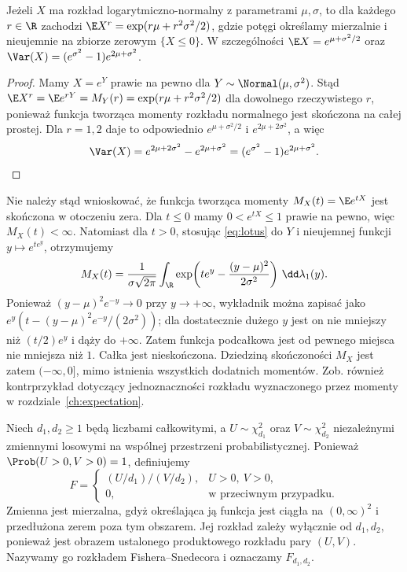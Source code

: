 \begin{stwierdzenie}
Jeżeli $X$ ma rozkład logarytmiczno-normalny
z parametrami $\mu,\sigma$, to dla każdego $r\in\R$
zachodzi $\E X^r=\exp(r\mu+r^2\sigma^2/2)$,
gdzie potęgi określamy mierzalnie i nieujemnie
na zbiorze zerowym $\{X\leq0\}$.
W szczególności $\E X=e^{\mu+\sigma^2/2}$ oraz
$\Var(X)=(e^{\sigma^2}-1)e^{2\mu+\sigma^2}$.
\end{stwierdzenie}
\begin{proof}
Mamy $X=e^Y$ prawie na pewno dla
$Y\sim\Normal(\mu,\sigma^2)$.
Stąd $\E X^r=\E e^{rY}=M_Y(r)=\exp(r\mu+r^2\sigma^2/2)$
dla dowolnego rzeczywistego $r$, ponieważ funkcja tworząca
momenty rozkładu normalnego jest skończona na całej prostej.
Dla $r=1,2$ daje to odpowiednio $e^{\mu+\sigma^2/2}$
i $e^{2\mu+2\sigma^2}$, a więc
\[
\Var(X)=e^{2\mu+2\sigma^2}-e^{2\mu+\sigma^2}
=(e^{\sigma^2}-1)e^{2\mu+\sigma^2}.
\]
\end{proof}
\begin{uwaga}
Nie należy stąd wnioskować, że funkcja tworząca momenty
$M_X(t)=\E e^{tX}$ jest skończona w otoczeniu zera.
Dla $t\leq0$ mamy $0<e^{tX}\leq1$ prawie na pewno,
więc $M_X(t)<\infty$. Natomiast dla $t>0$, stosując
\eqref{eq:lotus} do $Y$ i nieujemnej funkcji
$y\mapsto e^{te^y}$, otrzymujemy
\[
M_X(t)=\frac{1}{\sigma\sqrt{2\pi}}
\int_\R\exp\!\left(te^y-\frac{(y-\mu)^2}{2\sigma^2}\right)
\,\dd\lambda_1(y).
\]
Ponieważ $(y-\mu)^2e^{-y}\to0$ przy $y\to+\infty$,
wykładnik można zapisać jako
$e^y(t-(y-\mu)^2e^{-y}/(2\sigma^2))$;
dla dostatecznie dużego $y$ jest on nie mniejszy
niż $(t/2)e^y$ i dąży do $+\infty$.
Zatem funkcja podcałkowa jest od pewnego miejsca
nie mniejsza niż $1$. Całka jest nieskończona.
Dziedziną skończoności $M_X$ jest zatem $(-\infty,0]$,
mimo istnienia wszystkich dodatnich momentów.
Zob. również kontrprzykład dotyczący jednoznaczności
rozkładu wyznaczonego przez momenty w rozdziale~\ref{ch:expectation}.
\end{uwaga}

\begin{definicja}
Niech $d_1,d_2\geq1$ będą liczbami całkowitymi, a
$U\sim\chi^2_{d_1}$ oraz $V\sim\chi^2_{d_2}$ niezależnymi
zmiennymi losowymi na wspólnej przestrzeni probabilistycznej.
Ponieważ $\Prob(U>0,V>0)=1$, definiujemy
\[
F=\begin{cases}
(U/d_1)/(V/d_2),&U>0,\ V>0,\\
0,&\text{w przeciwnym przypadku}.
\end{cases}
\]
Zmienna jest mierzalna, gdyż określająca ją funkcja
jest ciągła na $(0,\infty)^2$ i przedłużona zerem
poza tym obszarem. Jej rozkład zależy wyłącznie od
$d_1,d_2$, ponieważ jest obrazem ustalonego produktowego
rozkładu pary $(U,V)$. Nazywamy go rozkładem
Fishera--Snedecora i oznaczamy $F_{d_1,d_2}$.
\end{definicja}

